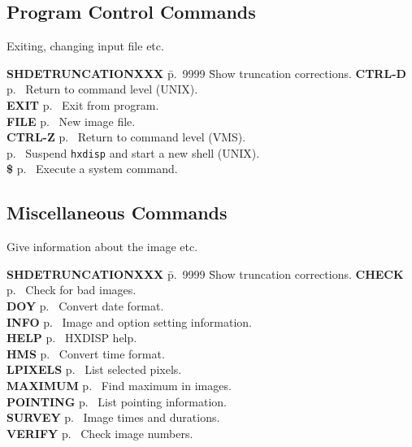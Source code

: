 \subsection{Program Control Commands}

Exiting, changing input file etc.

\begin{tabbing}
{\bf SHDETRUNCATIONXXX} \= p.~9999 \= Show truncation corrections.\kill
{\bf CTRL-D} \> p.~\pageref{eof} \> Return to command level (UNIX).\\
{\bf EXIT} \> p.~\pageref{ex} \> Exit from program.\\
{\bf FILE} \> p.~\pageref{fil} \> New image file.\\
{\bf CTRL-Z} \> p.~\pageref{eof} \> Return to command level (VMS). \\
\> p.~\pageref{dcl} \>  Suspend \verb!hxdisp! and start a
new shell (UNIX).\\
{\bf \$} \> p.~\pageref{dcl} \> Execute a system command.\\
\end{tabbing}

\subsection{Miscellaneous Commands}

Give information about the image etc.

\begin{tabbing}
{\bf SHDETRUNCATIONXXX} \= p.~9999 \= Show truncation corrections.\kill
{\bf CHECK} \> p.~\pageref{ch} \> Check for bad images.\\
{\bf DOY} \> p.~\pageref{do} \> Convert date format.\\
{\bf INFO} \> p.~\pageref{inf} \> Image and option setting
information.\\
{\bf HELP} \> p.~\pageref{he} \> HXDISP help.\\
{\bf HMS} \> p.~\pageref{hm} \> Convert time format.\\
{\bf LPIXELS} \> p.~\pageref{lp} \> List selected pixels.\\
{\bf MAXIMUM} \> p.~\pageref{max} \> Find maximum in images.\\
{\bf POINTING} \> p.~\pageref{po} \> List pointing information.\\
{\bf SURVEY} \> p.~\pageref{sur} \> Image times and durations.\\
{\bf VERIFY} \> p.~\pageref{ve} \> Check image numbers.\\
\end{tabbing}

